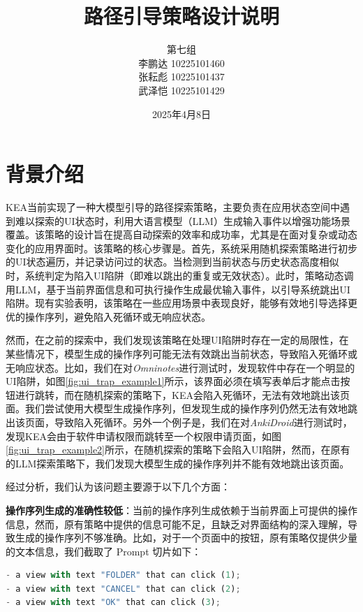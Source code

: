 \documentclass[UTF8, fontset=windows]{article}
\title{\textbf{路径引导策略设计说明}}
\author{第七组 \\ 
李鹏达 10225101460 \\
张耘彪 10225101437 \\
武泽恺 10225101429
}
\date{2025年4月8日}
\begin{document}
\maketitle

\section{背景介绍}

K{\small\MakeUppercase{ea}}当前实现了一种大模型引导的路径探索策略，主要负责在应用状态空间中遇到难以探索的UI状态时，利用大语言模型（LLM）生成输入事件以增强功能场景覆盖。该策略的设计旨在提高自动探索的效率和成功率，尤其是在面对复杂或动态变化的应用界面时。该策略的核心步骤是。首先，系统采用随机探索策略进行初步的UI状态遍历，并记录访问过的状态。当检测到当前状态与历史状态高度相似时，系统判定为陷入UI陷阱（即难以跳出的重复或无效状态）。此时，策略动态调用LLM，基于当前界面信息和可执行操作生成最优输入事件，以引导系统跳出UI陷阱。现有实验表明，该策略在一些应用场景中表现良好，能够有效地引导选择更优的操作序列，避免陷入死循环或无响应状态。

然而，在之前的探索中，我们发现该策略在处理UI陷阱时存在一定的局限性，在某些情况下，模型生成的操作序列可能无法有效跳出当前状态，导致陷入死循环或无响应状态。比如，我们在对\textit{Omninotes}进行测试时，发现软件中存在一个明显的UI陷阱，如图\ref{fig:ui_trap_example1}所示，该界面必须在填写表单后才能点击按钮进行跳转，而在随机探索的策略下，K{\small\MakeUppercase{ea}}会陷入死循环，无法有效地跳出该页面。我们尝试使用大模型生成操作序列，但发现生成的操作序列仍然无法有效地跳出该页面，导致陷入死循环。另外一个例子是，我们在对\textit{AnkiDroid}进行测试时，发现K{\small\MakeUppercase{ea}}会由于软件申请权限而跳转至一个权限申请页面，如图\ref{fig:ui_trap_example2}所示，在随机探索的策略下会陷入UI陷阱，然而，在原有的LLM探索策略下，我们发现大模型生成的操作序列并不能有效地跳出该页面。

经过分析，我们认为该问题主要源于以下几个方面：

\textbf{操作序列生成的准确性较低}：当前的操作序列生成依赖于当前界面上可提供的操作信息，然而，原有策略中提供的信息可能不足，且缺乏对界面结构的深入理解，导致生成的操作序列不够准确。比如，对于一个页面中的按钮，原有策略仅提供少量的文本信息，我们截取了 Prompt 切片如下：

\begin{lstlisting}[language=Python]
- a view with text "FOLDER" that can click (1);
- a view with text "CANCEL" that can click (2);
- a view with text "OK" that can click (3);
\end{lstlisting}
\end{document}
